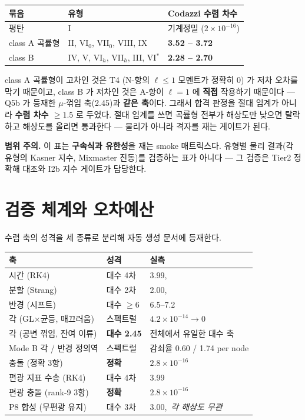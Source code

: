 \documentclass[11pt,a4paper]{article}
\begin{document}
\begin{center}\small
\begin{tabular}{@{}lll@{}}
\toprule
묶음 & 유형 & Codazzi 수렴 차수 \\
\midrule
평탄 & I & 기계정밀 ($2\times10^{-16}$) \\
class A 곡률형 & II, VI$_0$, VII$_0$, VIII, IX & \textbf{3.52 -- 3.72} \\
class B & IV, V, VI$_h$, VII$_h$, III, VI$^*$ & \textbf{2.28 -- 2.70} \\
\bottomrule
\end{tabular}
\end{center}

\noindent class A 곡률형이 고차인 것은 T4 (N-항의 $\ell\le1$ 모멘트가 정확히 0) 가
저차 오차를 막기 때문이고, class B 가 저차인 것은 A-항이 $\ell=1$ 에 \textbf{직접}
작용하기 때문이다 --- Q5b 가 등재한 $\mu$-꺾임 축(2.45)과 \textbf{같은 축}이다.
그래서 합격 판정을 절대 임계가 아니라 \textbf{수렴 차수 $\ge1.5$} 로 두었다.
절대 임계를 쓰면 곡률형 전부가 해상도만 낮으면 탈락하고 해상도를 올리면 통과한다 ---
물리가 아니라 격자를 재는 게이트가 된다.

\textbf{범위 주의.} 이 표는 \textbf{구속식과 유한성}을 재는 smoke 매트릭스다.
유형별 물리 결과(각 유형의 Kasner 지수, Mixmaster 진동)를 검증하는 표가 아니다 ---
그 검증은 Tier2 정확해 대조와 I2b 지수 게이트가 담당한다.

\section{검증 체계와 오차예산}

수렴 축의 성격을 세 종류로 분리해 자동 생성 문서에 등재한다.

\begin{center}\small
\begin{tabular}{@{}lll@{}}
\toprule
축 & 성격 & 실측 \\
\midrule
시간 (RK4) & 대수 4차 & 3.99,\;3.99 \\
분할 (Strang) & 대수 2차 & 2.00,\;2.00 \\
반경 (시프트) & 대수 $\ge6$ & 6.5--7.2 \\
각 (GL$\times$균등, 매끄러움) & 스펙트럴 & $4.2\times10^{-14}\to0$ \\
각 (공변 꺾임, 잔여 이류) & \textbf{대수 2.45} & 전체에서 유일한 대수 축 \\
Mode B 각 / 반경 정의역 & 스펙트럴 & 감쇠율 0.60 / 1.74 per node \\
충돌 (정확 3항) & \textbf{정확} & $2.8\times10^{-16}$ \\
편광 지표 수송 (RK4) & 대수 4차 & 3.99 \\
편광 충돌 (rank-9 3항) & \textbf{정확} & $2.8\times10^{-16}$ \\
P8 합성 (무편광 유지) & 대수 3차 & 3.00,\ \emph{각 해상도 무관} \\
\bottomrule
\end{tabular}
\end{center}
\end{document}
